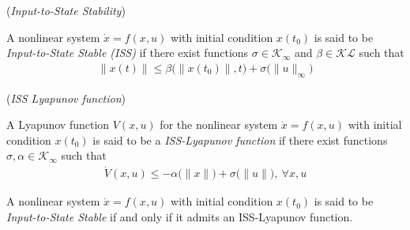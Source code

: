 \begin{bw_box}
\begin{definition}\cite{Sontag2008} (\textit{Input-to-State Stability})
\label{def:ISS}

  A nonlinear system $\dot{x} = f(x,u)$ with initial condition $x(t_0)$ is said
  to be \textit{Input-to-State Stable (ISS)} if there exist functions
  $\sigma \in \mathcal{K}_{\infty}$ and $\beta \in \mathcal{KL}$ such that
  \begin{align}
    \|x(t)\| \leq \beta\big(\|x(t_0)\|,t\big) + \sigma\big(\|u\|_{\infty}\big)
  \end{align}
\end{definition}
\end{bw_box}

\begin{bw_box}
\begin{definition}\cite{Sontag2008} (\textit{ISS Lyapunov function})
\label{def:ISS_Lyapunov}

  A Lyapunov function $V(x,u)$ for the nonlinear system $\dot{x} = f(x,u)$
  with initial condition $x(t_0)$ is said to be a \textit{ISS-Lyapunov function}
  if there exist functions $\sigma, \alpha \in \mathcal{K}_{\infty}$ such that
  \begin{align}
    \dot{V}(x,u) \leq -\alpha\big(\|x\|\big) + \sigma\big(\|u\|\big),\ \forall x,u
  \end{align}
\end{definition}
\end{bw_box}

\begin{bw_box}
\begin{theorem}\cite{Sontag2008}
\label{def:ISS_Lyapunov_admit_theorem}

  A nonlinear system $\dot{x} = f(x,u)$ with initial condition $x(t_0)$ is said
  to be \textit{Input-to-State Stable} if and only if it admits an
  ISS-Lyapunov function.
\end{theorem}
\end{bw_box}
